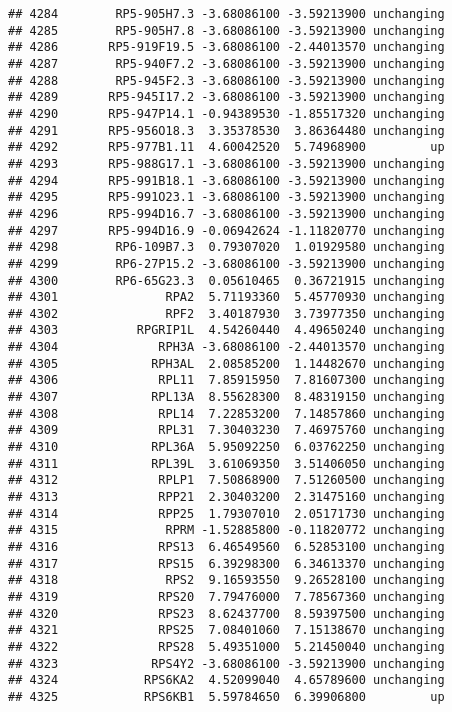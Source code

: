 \documentclass[]{article}
\begin{document}
\begin{verbatim}
## 4284        RP5-905H7.3 -3.68086100 -3.59213900 unchanging
## 4285        RP5-905H7.8 -3.68086100 -3.59213900 unchanging
## 4286       RP5-919F19.5 -3.68086100 -2.44013570 unchanging
## 4287        RP5-940F7.2 -3.68086100 -3.59213900 unchanging
## 4288        RP5-945F2.3 -3.68086100 -3.59213900 unchanging
## 4289       RP5-945I17.2 -3.68086100 -3.59213900 unchanging
## 4290       RP5-947P14.1 -0.94389530 -1.85517320 unchanging
## 4291       RP5-956O18.3  3.35378530  3.86364480 unchanging
## 4292       RP5-977B1.11  4.60042520  5.74968900         up
## 4293       RP5-988G17.1 -3.68086100 -3.59213900 unchanging
## 4294       RP5-991B18.1 -3.68086100 -3.59213900 unchanging
## 4295       RP5-991O23.1 -3.68086100 -3.59213900 unchanging
## 4296       RP5-994D16.7 -3.68086100 -3.59213900 unchanging
## 4297       RP5-994D16.9 -0.06942624 -1.11820770 unchanging
## 4298        RP6-109B7.3  0.79307020  1.01929580 unchanging
## 4299        RP6-27P15.2 -3.68086100 -3.59213900 unchanging
## 4300        RP6-65G23.3  0.05610465  0.36721915 unchanging
## 4301               RPA2  5.71193360  5.45770930 unchanging
## 4302               RPF2  3.40187930  3.73977350 unchanging
## 4303           RPGRIP1L  4.54260440  4.49650240 unchanging
## 4304              RPH3A -3.68086100 -2.44013570 unchanging
## 4305             RPH3AL  2.08585200  1.14482670 unchanging
## 4306              RPL11  7.85915950  7.81607300 unchanging
## 4307             RPL13A  8.55628300  8.48319150 unchanging
## 4308              RPL14  7.22853200  7.14857860 unchanging
## 4309              RPL31  7.30403230  7.46975760 unchanging
## 4310             RPL36A  5.95092250  6.03762250 unchanging
## 4311             RPL39L  3.61069350  3.51406050 unchanging
## 4312              RPLP1  7.50868900  7.51260500 unchanging
## 4313              RPP21  2.30403200  2.31475160 unchanging
## 4314              RPP25  1.79307010  2.05171730 unchanging
## 4315               RPRM -1.52885800 -0.11820772 unchanging
## 4316              RPS13  6.46549560  6.52853100 unchanging
## 4317              RPS15  6.39298300  6.34613370 unchanging
## 4318               RPS2  9.16593550  9.26528100 unchanging
## 4319              RPS20  7.79476000  7.78567360 unchanging
## 4320              RPS23  8.62437700  8.59397500 unchanging
## 4321              RPS25  7.08401060  7.15138670 unchanging
## 4322              RPS28  5.49351000  5.21450040 unchanging
## 4323             RPS4Y2 -3.68086100 -3.59213900 unchanging
## 4324            RPS6KA2  4.52099040  4.65789600 unchanging
## 4325            RPS6KB1  5.59784650  6.39906800         up

\end{verbatim}
\end{document}
